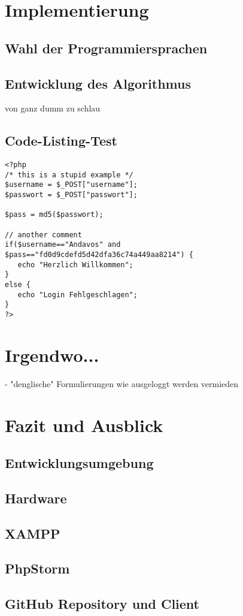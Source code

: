 \documentclass[12pt,a4paper,titlepage]{article} %
\begin{document}
\section{Implementierung}
\subsection{Wahl der Programmiersprachen}
\subsection{Entwicklung des Algorithmus}
von ganz dumm zu schlau


\subsection{Code-Listing-Test}
\begin{lstlisting}
<?php
/* this is a stupid example */
$username = $_POST["username"];
$passwort = $_POST["passwort"];

$pass = md5($passwort);

// another comment
if($username=="Andavos" and
$pass=="fd0d9cdefd5d42dfa36c74a449aa8214") {
   echo "Herzlich Willkommen";
}
else {
   echo "Login Fehlgeschlagen";
}
?>
\end{lstlisting}

\clearpage
\newpage

\section{Irgendwo...}
- "denglische" Formulierungen wie ausgeloggt werden vermieden

\section{Fazit und Ausblick} %



\clearpage
\newpage
\begin{appendix}


\section{Entwicklungsumgebung}
\subsection{Hardware}
\subsection{XAMPP}
\subsection{PhpStorm}
\subsection{GitHub Repository und Client}
\end{appendix}
\end{document}
